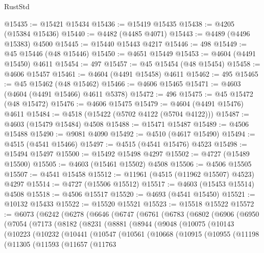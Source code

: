 \begin{lexlean}{RustStd}
\begin{coremodule}
@15435 := @15421 @15434
@15436 := @15419 @15435
@15438 := @4205 (@15384 @15436)
@15440 := @4482 (@4485 @4071)
@15443 := @4489 (@4496 @15383) @4500
@15445 := @15440 @15443 @4217
@15446 := 498
@15449 := @45 @15446 (@48 @15446)
@15450 := @4651 @15449
@15453 := @4604 (@4491 @15450) @4611
@15454 := 497
@15457 := @45 @15454 (@48 @15454)
@15458 := @4606 @15457
@15461 := @4604 (@4491 @15458) @4611
@15462 := 495
@15465 := @45 @15462 (@48 @15462)
@15466 := @4606 @15465
@15471 := @4603 (@4604 (@4491 @15466) @4611 @5378)
@15472 := 496
@15475 := @45 @15472 (@48 @15472)
@15476 := @4606 @15475
@15479 := @4604 (@4491 @15476) @4611
@15484 := @4518 (@15422 (@5702 @4122 (@5704 @4122)))
@15487 := @4603 (@15479 @15484) @4508
@15488 := @15471 @15487
@15489 := @4506 @15488
@15490 := @9081 @4090
@15492 := @4510 (@4617 @15490)
@15494 := @4515 (@4541 @15466)
@15497 := @4515 (@4541 @15476) @4523
@15498 := @15494 @15497
@15500 := @15492 @15498 @4297
@15502 := @4727 (@15489 @15500)
@15505 := @4603 (@15461 @15502) @4508
@15506 := @4506 @15505
@15507 := @4541 @15458
@15512 := @11961 (@4515 (@11962 @15507) @4523) @4297
@15514 := @4727 (@15506 @15512)
@15517 := @4603 (@15453 @15514) @4508
@15518 := @4506 @15517
@15520 := @4693 (@4541 @15450)
@15521 := @10132 @15433
@15522 := @15520 @15521
@15523 := @15518 @15522
@15572 := @6073
    (@6242
      (@6278
        (@6646
          (@6747
            (@6761
              (@6783
                (@6802
                  (@6906
                    (@6950
                      (@7054
                        (@7173
                          (@8182
                            (@8231
                              (@8881
                                (@8944
                                  (@9048
                                    (@10075
                                      (@10143
                                        (@10223
                                          (@10232
                                            (@10441
                                              (@10547
                                                (@10561
                                                  (@10668
                                                    (@10915
                                                      (@10955
                                                        (@11198
                                                          (@11305
                                                            (@11593
                                                              (@11657
                                                                (@11763

\end{coremodule}
\end{lexlean}
